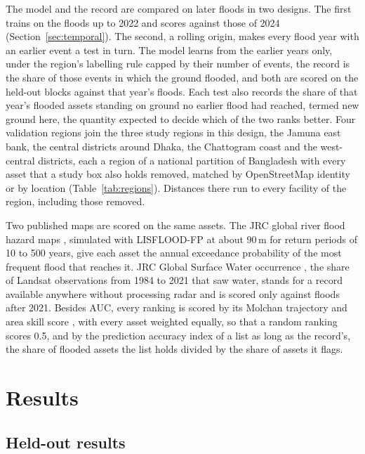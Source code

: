 \documentclass[10pt,a4paper,twocolumn]{article}
\begin{document}
The model and the record are compared on later floods in two designs. The first trains on the floods up to 2022 and scores against those of 2024 (Section~\ref{sec:temporal}). The second, a rolling origin, makes every flood year with an earlier event a test in turn. The model learns from the earlier years only, under the region's labelling rule capped by their number of events, the record is the share of those events in which the ground flooded, and both are scored on the held-out blocks against that year's floods. Each test also records the share of that year's flooded assets standing on ground no earlier flood had reached, termed new ground here, the quantity expected to decide which of the two ranks better. Four validation regions join the three study regions in this design, the Jamuna east bank, the central districts around Dhaka, the Chattogram coast and the west-central districts, each a region of a national partition of Bangladesh with every asset that a study box also holds removed, matched by OpenStreetMap identity or by location (Table~\ref{tab:regions}). Distances there run to every facility of the region, including those removed.

Two published maps are scored on the same assets. The JRC global river flood hazard maps \citep{baugh2024}, simulated with LISFLOOD-FP at about 90\,m for return periods of 10 to 500 years, give each asset the annual exceedance probability of the most frequent flood that reaches it. JRC Global Surface Water occurrence \citep{pekel2016}, the share of Landsat observations from 1984 to 2021 that saw water, stands for a record available anywhere without processing radar and is scored only against floods after 2021. Besides AUC, every ranking is scored by its Molchan trajectory and area skill score \citep{zechar2008}, with every asset weighted equally, so that a random ranking scores 0.5, and by the prediction accuracy index \citep{chainey2008} of a list as long as the record's, the share of flooded assets the list holds divided by the share of assets it flags.

\section{Results}
\label{sec:validation}

\subsection{Held-out results}
\end{document}
